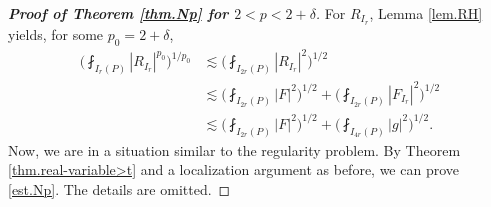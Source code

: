 \documentclass[reqno,12pt]{amsart} %
\theoremstyle{definition}
\theoremstyle{remark}
\numberwithin{equation}{section}
\newcommand{\e}{\varepsilon}
\begin{document}
\begin{proof}[\textbf{Proof of Theorem \ref{thm.Np} for $2<p<2+\delta$}]
For $R_{I_r}$, Lemma \ref{lem.RH} yields, for some $p_0 = 2+\delta$,
\begin{equation}
\begin{aligned}
    \bigg(\fint_{I_r(P)} |R_{I_r}|^{p_0} \bigg)^{1/p_0} & \lesssim \bigg(\fint_{I_{2r}(P)} |R_{I_{r}}|^{2} \bigg)^{1/2} \\
    &\lesssim \bigg(\fint_{I_{2r}(P)} |F|^{2} \bigg)^{1/2} + \bigg(\fint_{I_{2r}(P)} |F_{I_{r}}|^{2} \bigg)^{1/2} \\
    & \lesssim \bigg(\fint_{I_{2r}(P)} |F|^{2} \bigg)^{1/2} + \bigg(\fint_{I_{4r}(P)} |g|^{2} \bigg)^{1/2}.
    \end{aligned}
\end{equation}
Now, we are in a situation similar to the regularity problem. By Theorem \ref{thm.real-variable>t} and a localization argument as before, we can prove \eqref{est.Np}. The details are omitted.
\end{proof}
\end{document}
